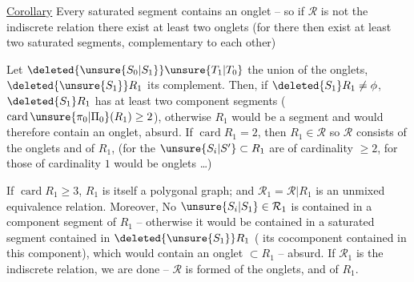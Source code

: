 \uline{Corollary} Every  saturated segment contains an onglet -- so if $\mathcal{R}$ is not the indiscrete relation there exist at least two onglets (for there then exist at least two saturated segments, complementary to each other)

Let  $\deleted{\unsure{S_{0}|S_1}}\unsure{T_{1}|T_{0}}$ the union of the onglets, $\deleted{\unsure{S_1}}R_1$ its complement. Then, if $\deleted{S_1}R_1\ne\phi$, $\deleted{S_1}R_1$ has at least two component segments ($\operatorname{card}\unsure{\pi_0|\Pi_0}(R_1)\geq 2$), otherwise $R_1$ would be a segment and would therefore contain an onglet, absurd. If $\operatorname{card} R_1=2$, then $R_1\in\mathcal{R}$  so $\mathcal{R}$ consists of the onglets and of $R_1$, (for  the $\unsure{S_i|S'}\subset R_1$ are of cardinality $\geq 2$,  for those of cardinality $1$ would be onglets \ldots)

If $\operatorname{card} R_1\geq 3$, $R_1$ is itself a polygonal graph; and $\mathcal{R}_1=\mathcal{R}\vert R_1$ is an unmixed equivalence relation. Moreover, No $\unsure{S_i|S_1}\in\mathcal{R}_1$ is contained in a component segment of $R_1$ -- otherwise it would be contained in a saturated segment contained in $\deleted{\unsure{S_1}}R_1$ ( its cocomponent contained in this component), which would contain an onglet $\subset R_1$ -- absurd. If $\mathcal{R}_1$ is the indiscrete relation, we are done -- $\mathcal{R}$ is formed of the onglets, and of $R_1$.
